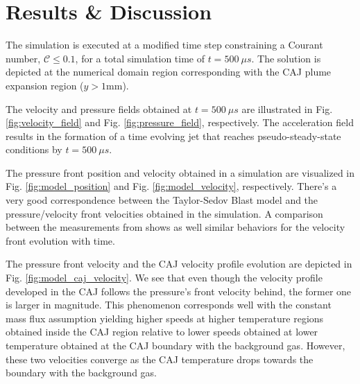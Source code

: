 \documentclass[a4paper]{iacas}%
\begin{document}
\section{Results \& Discussion}

The simulation is executed at a modified time step  constraining a Courant number, $\mathcal{C} \leq 0.1$, for a total simulation time of $t = 500~\mu s$. The solution is depicted at the numerical domain region corresponding with the CAJ plume expansion region ($ y > 1 \mathrm{mm} $). 

The velocity and pressure fields obtained at $ t = 500~\mu s $ are illustrated in Fig. \ref{fig:velocity_field} and Fig. \ref{fig:pressure_field}, respectively. The acceleration field results in the formation of a time evolving jet that reaches pseudo-steady-state conditions by $t = 500~\mu s$.

The pressure front position and velocity obtained in a simulation are visualized in Fig. \ref{fig:model_position} and Fig. \ref{fig:model_velocity}, respectively. There's a very good correspondence between the Taylor-Sedov \cite{TAYLOR,SEDOV} Blast model and the pressure/velocity front velocities obtained in the simulation. A comparison between the measurements from \cite{KR} shows as well similar behaviors for the velocity front evolution with time.

The pressure front velocity and the CAJ velocity profile evolution are depicted in Fig. \ref{fig:model_caj_velocity}. We see that even though the velocity profile developed in the CAJ  follows the pressure's front velocity behind, the former one is larger in magnitude. This phenomenon corresponds well with the constant mass flux assumption yielding higher speeds at higher temperature regions obtained inside the CAJ region relative to lower speeds obtained at lower temperature obtained at the CAJ boundary with the background gas. However, these two velocities converge as the CAJ temperature drops towards the boundary with the background gas. 
\end{document}
